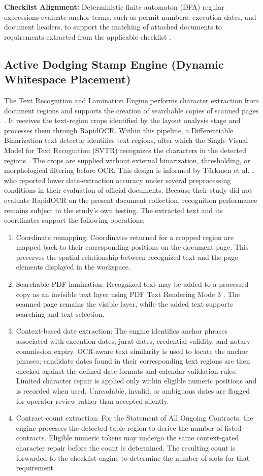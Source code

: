 \textbf{Checklist Alignment:} Deterministic finite automaton (DFA) regular expressions evaluate anchor terms, such as permit numbers, execution dates, and document headers, to support the matching of attached documents to requirements extracted from the applicable checklist \cite{ref25,ref26}.

\subsection{Active Dodging Stamp Engine (Dynamic Whitespace Placement)}
The Text Recognition and Lamination Engine performs character extraction from document regions and supports the creation of searchable copies of scanned pages \cite{ref22}. It receives the text-region crops identified by the layout analysis stage and processes them through RapidOCR. Within this pipeline, a Differentiable Binarization text detector identifies text regions, after which the Single Visual Model for Text Recognition (SVTR) recognizes the characters in the detected regions \cite{ref23,ref24}. The crops are supplied without external binarization, thresholding, or morphological filtering before OCR. This design is informed by Türkmen et al. \cite{docxb2}, who reported lower date-extraction accuracy under several preprocessing conditions in their evaluation of official documents. Because their study did not evaluate RapidOCR on the present document collection, recognition performance remains subject to the study's own testing. The extracted text and its coordinates support the following operations:
\begin{enumerate}
\item Coordinate remapping: Coordinates returned for a cropped region are mapped back to their corresponding positions on the document page. This preserves the spatial relationship between recognized text and the page elements displayed in the workspace.
\item Searchable PDF lamination: Recognized text may be added to a processed copy as an invisible text layer using PDF Text Rendering Mode 3 \cite{ref13,ref18}. The scanned page remains the visible layer, while the added text supports searching and text selection.
\item Context-based date extraction: The engine identifies anchor phrases associated with execution dates, jurat dates, credential validity, and notary commission expiry. OCR-aware text similarity is used to locate the anchor phrases; candidate dates found in their corresponding text regions are then checked against the defined date formats and calendar validation rules. Limited character repair is applied only within eligible numeric positions and is recorded when used. Unreadable, invalid, or ambiguous dates are flagged for operator review rather than accepted silently.
\item Contract-count extraction: For the Statement of All Ongoing Contracts, the engine processes the detected table region to derive the number of listed contracts. Eligible numeric tokens may undergo the same context-gated character repair before the count is determined. The resulting count is forwarded to the checklist engine to determine the number of slots for that requirement.
\end{enumerate}
